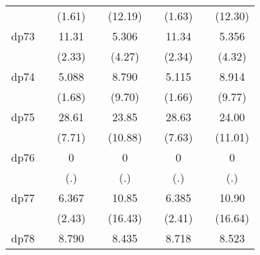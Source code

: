 {\begin{tabular}{l*{8}{c}}
            &                     &      (1.61)         &                     &     (12.19)         &                     &      (1.63)         &                     &     (12.30)         \\
[1em]
dp73        &                     &       11.31\sym{*}  &                     &       5.306\sym{***}&                     &       11.34\sym{*}  &                     &       5.356\sym{***}\\
            &                     &      (2.33)         &                     &      (4.27)         &                     &      (2.34)         &                     &      (4.32)         \\
[1em]
dp74        &                     &       5.088         &                     &       8.790\sym{***}&                     &       5.115         &                     &       8.914\sym{***}\\
            &                     &      (1.68)         &                     &      (9.70)         &                     &      (1.66)         &                     &      (9.77)         \\
[1em]
dp75        &                     &       28.61\sym{***}&                     &       23.85\sym{***}&                     &       28.63\sym{***}&                     &       24.00\sym{***}\\
            &                     &      (7.71)         &                     &     (10.88)         &                     &      (7.63)         &                     &     (11.01)         \\
[1em]
dp76        &                     &           0         &                     &           0         &                     &           0         &                     &           0         \\
            &                     &         (.)         &                     &         (.)         &                     &         (.)         &                     &         (.)         \\
[1em]
dp77        &                     &       6.367\sym{*}  &                     &       10.85\sym{***}&                     &       6.385\sym{*}  &                     &       10.90\sym{***}\\
            &                     &      (2.43)         &                     &     (16.43)         &                     &      (2.41)         &                     &     (16.64)         \\
[1em]
dp78        &                     &       8.790\sym{*}  &                     &       8.435\sym{***}&                     &       8.718\sym{*}  &                     &       8.523\sym{***}\\

\end{tabular}}
